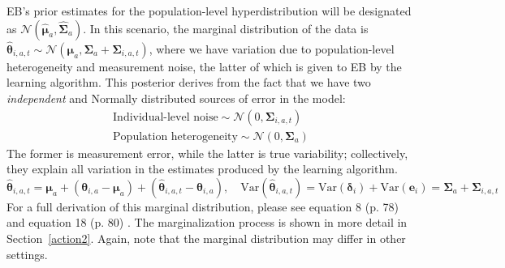 \documentclass[letterpaper, 9pt]{extarticle}
\newcounter{samcommentcounter}
\newcommand{\sam}[1]{%
  \stepcounter{samcommentcounter}%
  {\color{blue} [\textbf{SAM} (\thesamcommentcounter): {#1}]}%
}
\begin{document}
EB's prior estimates for the population-level hyperdistribution will be designated as $\mathcal{N}(\hat{\boldsymbol{\mu}}_a,\boldsymbol{\hat{\Sigma}}_a)$. In this scenario, 
the marginal distribution of the data is $\hat{\boldsymbol{\theta}}_{i,a,t}
\sim
\mathcal{N}(\boldsymbol{\mu}_a,\boldsymbol{\Sigma}_a+\boldsymbol{\Sigma}_{i,a,t})$, where we have variation due to population-level heterogeneity and measurement noise, the latter of which is given to EB by the learning algorithm. This posterior derives from the fact that we have two \textit{independent} and Normally distributed sources of error in the model: 
\begin{align*}
\text{Individual-level noise} \sim \mathcal{N}(0,\boldsymbol{\Sigma}_{i,a,t})\\
\text{Population heterogeneity} \sim \mathcal{N}(0,\boldsymbol{\Sigma}_a)
\end{align*}
The former is measurement error, while the latter is true variability; collectively, they explain all variation in the estimates produced by the learning algorithm.  %
$$\hat{\boldsymbol{\theta}}_{i,a,t} = \boldsymbol{\mu}_a + \left(\boldsymbol{\theta}_{i,a} - \boldsymbol{\mu}_a\right) + \left(\hat{\boldsymbol{\theta}}_{i,a,t} - \boldsymbol{\theta}_{i,a}\right), \quad \mathrm{Var}(\hat{\boldsymbol{\theta}}_{i,a,t}) = \mathrm{Var}(\boldsymbol{\delta}_i) + \mathrm{Var}(\mathbf{e}_i) = \boldsymbol{\Sigma}_a + \boldsymbol{\Sigma}_{i,a,t}$$
For a full derivation of this marginal distribution, please see equation 8 (p. 78) and equation 18 (p. 80) \autocite{doi:10.3102/10769986010002075}. The marginalization process is shown in more detail in Section~\ref{action2}. Again, note that the marginal distribution may differ in other settings. 
\end{document}
